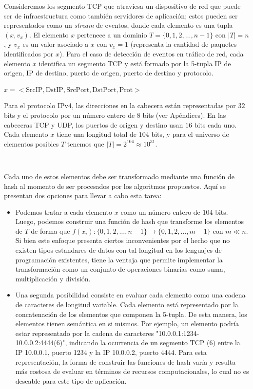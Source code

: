 \documentclass[a4paper,12pt, oneside]{article}
\begin{document}
Consideremos los segmento TCP que atraviesa un dispositivo de red que puede ser de infraestructura como también servidores de aplicación; estos pueden ser representados como un \textit{stream} de eventos, donde cada elemento es una tupla $(x, v_x)$. El elemento $x$ pertenece a un dominio $T=\{0,1,2, \dots, n-1\}$ con $|T|=n$, y $v_x$ es un valor asociado a $x$ con $v_x=1$ (representa la cantidad de paquetes identificados por $x$). Para el caso de detección de eventos en tráfico de red, cada elemento $x$ identifica un segmento TCP y está formado por la 5-tupla IP de origen, IP de destino, puerto de origen, puerto de destino y protocolo. 

\begin{center}
	$x = <\text{SrcIP}, \text{DstIP}, \text{SrcPort}, \text{DstPort}, \text{Prot}>$
\end{center}

Para el protocolo IPv4\cite{rfc791}, las direcciones en la cabecera están representadas por $32$ bits y el protocolo por un número entero de $8$ bits (ver Apéndices). En las cabeceras TCP y UDP, los puertos de origen y destino usan $16$ bits cada uno. Cada elemento $x$ tiene una longitud total de $104$ bits, y para el universo de elementos posibles $T$ tenemos que $|T| = 2^{104} \approx 10 ^ {31}$.

\

Cada uno de estos elementos debe ser transformado mediante una función de hash al momento de ser procesados por los algoritmos propuestos. Aquí se presentan dos opciones para llevar a cabo esta tarea:
\begin{itemize}
	\item Podemos tratar a cada elemento $x$ como un número entero de $104$ bits. Luego, podemos construir una función de hash que transforme los elementos de $T$ de forma que $f(x_i): \{0,1,2, \dots, n-1\} \rightarrow \{0,1,2, \dots, m-1\}$ con $m \ll n$. Si bien este enfoque presenta ciertos inconvenientes por el hecho que no existen tipos estandares de datos con tal longitud en los lenguajes de programación existentes, tiene la ventaja que permite implementar la transformación como un conjunto de operaciones binarias como suma, multiplicación y división.
	\item Una segunda posibilidad consiste en evaluar cada elemento como una cadena de caracteres de longitud variable. Cada elemento está representado por la concatenación de los elementos que componen la 5-tupla. De esta manera, los elementos tienen semántica en si mismos. Por ejemplo, un elemento podría estar representado por la cadena de caracteres "10.0.0.1:1234-10.0.0.2:4444(6)", indicando la ocurrencia de un segmento TCP (6) entre la IP 10.0.0.1, puerto 1234 y la IP 10.0.0.2, puerto 4444. Para esta representación, la forma de construir las funciones de hash varía y resulta más costosa de evaluar en términos de recursos computacionales, lo cual no es deseable para este tipo de aplicación.
\end{itemize}
\end{document}
